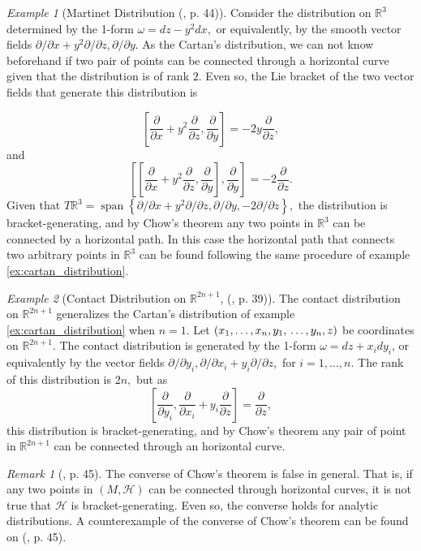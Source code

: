 \documentclass[12pt, letterpaper, reqno]{amsart}
\theoremstyle{definition}
\theoremstyle{plain}
\theoremstyle{remark}
\newtheorem{ex}{Example}
\newtheorem{rem}{Remark}
\begin{document}
\begin{ex}[Martinet Distribution (\cite{montgomery2002tour}, p. 44)]
	Consider the distribution on $ \mathbb{R}^3 $ determined by the 1-form $ \omega = dz-y^2dx, $ or equivalently, by the smooth vector fields $ \partial/\partial x+y^2\partial/\partial z, \partial/\partial y $. As the Cartan's distribution, we can not know beforehand if two pair of points can be connected through a horizontal curve given that the distribution is of rank $ 2. $ Even so, the Lie bracket of the two vector fields that generate this distribution is  

	$$ \left[ \frac{\partial }{\partial x} + y^2 \frac{\partial }{\partial z} , \frac{\partial }{\partial y}  \right] =-2y \frac{\partial }{\partial z}, $$ 
	and 
	$$ \left[\left[ \frac{\partial }{\partial x} + y^2 \frac{\partial }{\partial z} , \frac{\partial }{\partial y}  \right], \frac{\partial }{\partial y} \right] = -2 \frac{\partial }{\partial z}.  $$ 
	Given that $ T \mathbb{R}^3 = \operatorname{span} \left\{ \partial/\partial x+ y^2\partial/\partial z, \partial/\partial y, -2\partial/\partial z \right\},  $ the distribution is bracket-generating, and by Chow's theorem any two points in $ \mathbb{R}^3 $ can be connected by a horizontal path. In this case the horizontal path that connects two arbitrary points in $ \mathbb{R}^3 $ can be found following the same procedure of example \ref{ex:cartan_distribution}.
\end{ex}

\begin{ex}[Contact Distribution on $ \mathbb{R}^{2n+1} $, (\cite{montgomery2002tour}, p. 39)]
	The contact distribution on $ \mathbb{R}^{2n+1} $ generalizes the Cartan's distribution of example \ref{ex:cartan_distribution} when $ n=1 $. Let $ (x_1,\dots,x_n,y_1,\\\dots, y_n,z) $ be coordinates on $ \mathbb{R}^{2n+1} $. The contact distribution is generated by the 1-form $ \omega = dz+ x_i dy_i$, or equivalently by the vector fields $ \partial/ \partial y_i, \partial/ \partial x_i+ y_i \partial/\partial z, $ for $ i=1,\dots, n. $ The rank of this distribution is $ 2n, $ but as 
	$$ \left[ \frac{\partial }{\partial y_i} , \frac{\partial }{\partial x_i} + y_i \frac{\partial }{\partial z}  \right] = \frac{\partial }{\partial z},  $$ 
	this distribution is bracket-generating, and by Chow's theorem any pair of point in $ \mathbb{R}^{2n+1} $ can be connected through an horizontal curve.
\end{ex}

\begin{rem}[\cite{montgomery2002tour}, p. 45]
	The converse of Chow's theorem is false in general. That is, if any two points in $ (M,\mathcal{H}) $ can be connected through horizontal curves, it is not true that $ \mathcal{H} $ is bracket-generating. Even so, the converse holds for analytic distributions. A counterexample of  the converse of Chow's theorem can be found on (\cite{montgomery2002tour}, p. 45).
\end{rem}
\end{document}
